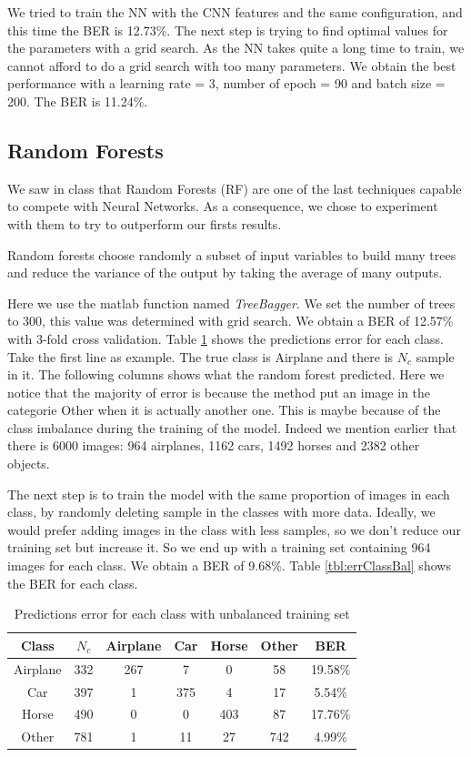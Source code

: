 \documentclass{article} %
\begin{document}
We tried to train the NN with the CNN features and the same configuration, and this time the BER is 12.73\%.
The next step is trying to find optimal values for the parameters with a grid search. As the NN takes quite a long time to train, we cannot afford to do a grid search with too many parameters.
We obtain the best performance with a learning rate = 3, number of epoch = 90 and batch size = 200. 
The BER is 11.24\%.


\subsection{Random Forests}
We saw in class that Random Forests (RF) are one of the last techniques capable to compete with Neural Networks.
As a consequence, we chose to experiment with them to try to outperform our firsts results.

Random forests choose randomly a subset of input variables to build many trees and reduce the variance of the output by taking the average of many outputs.

Here we use the matlab function named \emph{TreeBagger}. We set the number of trees to 300, this value was determined with grid search.
We obtain a BER of 12.57\% with 3-fold cross validation. Table \ref{tbl:errClassNotBal} shows the predictions error for each class. Take the first line as example. The true class is Airplane and there is $N_c$ sample in it. The following columns shows what the random forest predicted.
Here we notice that the majority of error is because the method put an image in the categorie Other when it is actually another one.
This is maybe because of the class imbalance during the training of the model. Indeed we mention earlier that there is 6000 images: 964 airplanes, 1162 cars, 1492 horses and 2382 other objects.

The next step is to train the model with the same proportion of images in each class, by randomly deleting sample in the classes with more data. Ideally, we would prefer adding images in the class with less samples, so we don't reduce our training set but increase it.
So we end up with a training set containing 964 images for each class. 
We obtain a BER of 9.68\%. Table \ref{tbl:errClassBal} shows the BER for each class.

\begin{table}[!htb]
	\centering
		\begin{tabular}{|c|c|c|c|c|c|c|}
			\hline Class & $N_{c}$ & Airplane & Car & Horse & Other & BER \\ 
			\hline Airplane & 332 & 267 & 7 & 0 & 58 & 19.58\% \\ 
			\hline Car & 397 & 1 & 375 & 4 & 17 & 5.54\% \\ 
			\hline Horse & 490 & 0 & 0 & 403 & 87 & 17.76\% \\ 
			\hline Other & 781 & 1 & 11 & 27 & 742 & 4.99\% \\ 
			\hline 
		\end{tabular} 
		\caption{Predictions error for each class with unbalanced training set}
		\label{tbl:errClassNotBal}
\end{table}
\end{document}
